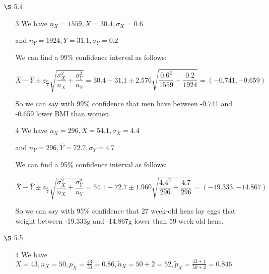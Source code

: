 \documentclass[12pt,letterpaper]{article}
\begin{document}
\begin{enumerate}
\begin{enumerate}
          We compute
          \[
            13 \pm 2.977 \frac{2}{\sqrt{15}} = (11.463, 14.537)
          \]

          So we can say with 99\% confidence
          that the mean track length is in the interval (11.463\si{\um}, 14.537\si{\um}).
        \item [11]
          We have $n = 6, \overline{X} = 2.03, s = 0.090$.

          We compute
          \[
            2.03 \pm 2.015 \frac{0.090}{\sqrt{6}} = (1.956, 2.104)
          \]

          So we can say with 90\% confidence
          that the mean deflection caused by a 160\si{\kN} load
          is in the interval (1.956\si{\mm}, 2.104\si{\mm}).
      \end{enumerate}
    \item [$\S$ 5.4]
      \begin{enumerate}
        \item [3]
          We have $n_X = 1559, \overline{X} = 30.4, \sigma_X = 0.6$

          and $n_Y = 1924, \overline{Y} = 31.1, \sigma_Y = 0.2$

          We can find a 99\% confidence interval as follows:

          \[
            \overline{X} - \overline{Y} \pm z_{\frac{\alpha}{2}} \sqrt{\frac{\sigma_X^2}{n_X} + \frac{\sigma_Y^2}{n_Y}} =
            30.4 - 31.1 \pm 2.576 \sqrt{\frac{0.6^2}{1559} + \frac{0.2}{1924}} =
            (-0.741, -0.659)
          \]

          So we can say with 99\% confidence that men have between -0.741 and -0.659 lower BMI than women.
        \item [4]
          We have $n_X = 296, \overline{X} = 54.1, \sigma_X = 4.4$

          and $n_Y = 296, \overline{Y} = 72.7, \sigma_Y = 4.7$

          We can find a 95\% confidence interval as follows:

          \[
            \overline{X} - \overline{Y} \pm z_{\frac{\alpha}{2}} \sqrt{\frac{\sigma_X^2}{n_X} + \frac{\sigma_Y^2}{n_Y}} =
            54.1 - 72.7 \pm 1.960 \sqrt{\frac{4.4^2}{296} + \frac{4.7}{296}} =
            (-19.333, -14.867)
          \]

          So we can say with 95\% confidence that 27 week-old hens lay eggs that weight between -19.333\si{\g} and -14.867\si{\g} lower than 59 week-old hens.
      \end{enumerate}
    \item [$\S$ 5.5]
      \begin{enumerate}
        \item [4]
          We have $X = 43, n_X = 50, p_X = \frac{43}{50} = 0.86, \tilde{n}_X = 50 + 2 = 52, \tilde{p}_X = \frac{43 + 1}{50 + 2} = 0.846$


\end{enumerate}
\end{enumerate}
\end{document}
